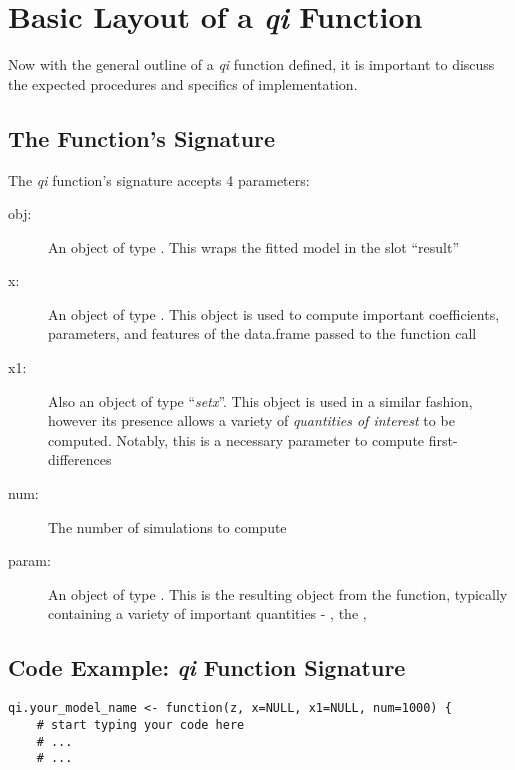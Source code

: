 \documentclass[10pt]{article}
\begin{document}
%
\section{Basic Layout of a \emph{qi} Function}
Now with the general outline of a \emph{qi} function defined, it is
important to discuss the expected procedures and specifics of
implementation.


\subsection{The Function's Signature}
The \emph{qi} function's signature accepts 4 parameters:


%
%
\begin{description}

	\item[obj:] An object of type .  This wraps the fitted
		model in the slot ``result''
		
	\item[x:] An object of type .  This object is used to compute
		important coefficients, parameters, and features of the data.frame passed to
		the function call

	\item[x1:] Also an object of type ``\emph{setx}''.  This object is used in a
		similar fashion, however its presence allows a variety of \emph{quantities
		of interest} to be computed.  Notably, this is a necessary parameter to
		compute first-differences
	
	\item[num:] The number of simulations to compute

	\item[param:] An object of type . This is the resulting object from
		the  function, typically containing a variety of important quantities
		- , the , \code{}

\end{description}


%
\subsection{Code Example: \emph{qi} Function Signature}
\begin{verbatim}
qi.your_model_name <- function(z, x=NULL, x1=NULL, num=1000) {
	# start typing your code here
	# ...
	# ...
\end{verbatim}
\end{document}
